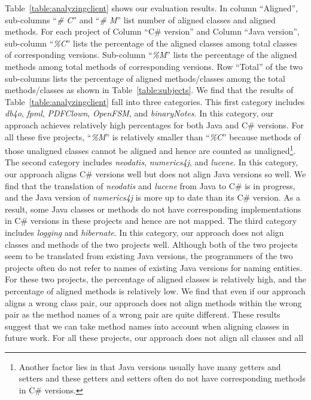 Table~\ref{table:analyzingclient} shows our evaluation results.
In column ``Aligned'', sub-columns ``\emph{\# C}'' and
``\emph{\# M}'' list number of aligned classes and aligned methods.
For each project of Column ``C\# version'' and
Column ``Java version'', sub-column ``\emph{\%C}'' lists the
percentage of the aligned classes among total classes of
corresponding versions. Sub-column ``\emph{\%M}'' lists the
percentage of the aligned methods among total methods of
corresponding versions. Row ``Total'' of the two sub-columns lists
the percentage of aligned methods/classes among the total
methods/classes as shown in Table~\ref{table:subjects}. We find that
the results of Table~\ref{table:analyzingclient} fall into three
categories. This first category includes \emph{db4o}, \emph{fpml},
\emph{PDFClown}, \emph{OpenFSM}, and \emph{binaryNotes}. In this category, our
approach achieves relatively high percentages for both Java
and C\# versions. For all these five projects, ``\emph{\%M}'' is
relatively smaller than ``\emph{\%C}'' because methods of those
unaligned classes cannot be aligned and hence are counted as
unaligned\footnote{Another factor lies in that Java versions usually
have many getters and setters and these getters and setters often do
not have corresponding methods in C\# versions.}. The second
category includes \emph{neodatis}, \emph{numerics4j}, and
\emph{lucene}. In this category, our approach aligns C\# versions well but does
not align Java versions so well. We find that the translation of \emph{neodatis} and
\emph{lucene} from Java to C\# is in progress, and the
Java version of \emph{numerics4j} is more up to date than its
C\# version. As a result, some Java classes or methods do not have
corresponding implementations in C\# versions in these projects and
hence are not mapped. The third category includes \emph{logging}
and \emph{hibernate}. In this category, our approach does not align classes and
methods of the two projects well. Although both of the two projects
seem to be translated from existing Java versions, the programmers of
the two projects often do not refer to names of existing Java
versions for naming entities. For these two projects, the
percentage of aligned classes is relatively high, and the percentage
of aligned methods is relatively low. We find that even if our
approach aligns a wrong class pair, our approach does not align
methods within the wrong pair as the method names of a wrong pair
are quite different. These results suggest that we can take method
names into account when aligning classes in future work. For all
these projects, our approach does not align all classes and all
